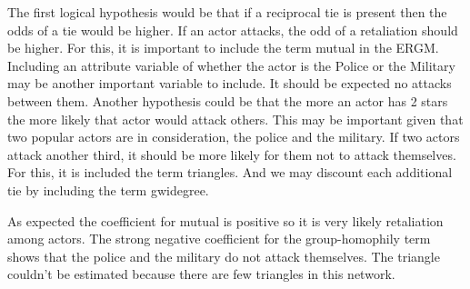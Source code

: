 \documentclass[12pt, letterpaper, notitlepage, onecolumn, twoside, openbib]{article}\usepackage[]{graphicx}\usepackage[]{color}
\begin{document}
The first logical hypothesis would be that if a reciprocal tie is present then the odds of a tie would be higher. If an actor attacks, the odd of a retaliation should be higher. For this, it is important to include the term mutual in the ERGM. Including an attribute variable of whether the actor is the Police or the Military may be another important variable to include. It should be expected no attacks between them. Another hypothesis could be that the more an actor has 2 stars the more likely that actor would attack others. This may be important given that two popular actors are in consideration, the police and the military. If two actors attack another third, it should be more likely for them not to attack themselves. For this, it is included the term triangles. And we may discount each additional tie by including the term gwidegree.

As expected the coefficient for mutual is positive so it is very likely retaliation among actors. The strong negative coefficient for the group-homophily term shows that the police and the military do not attack themselves. The triangle couldn't be estimated because there are few triangles in this network. 
\end{document}
